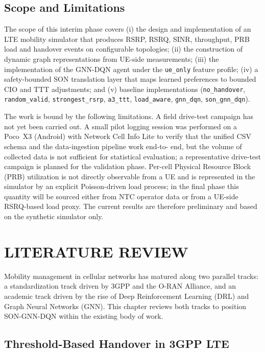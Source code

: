 \documentclass[12pt,a4paper,oneside]{report}
\begin{document}
\section{Scope and Limitations}

The scope of this interim phase covers (i) the design and implementation
of an LTE mobility simulator that produces RSRP, RSRQ, SINR, throughput,
PRB load and handover events on configurable topologies; (ii) the
construction of dynamic graph representations from UE-side measurements;
(iii) the implementation of the GNN-DQN agent under the
\texttt{ue\_only} feature profile; (iv) a safety-bounded SON translation
layer that maps learned preferences to bounded CIO and TTT adjustments;
and (v) baseline implementations (\texttt{no\_handover},
\texttt{random\_valid}, \texttt{strongest\_rsrp}, \texttt{a3\_ttt},
\texttt{load\_aware}, \texttt{gnn\_dqn}, \texttt{son\_gnn\_dqn}).

The work is bound by the following limitations. A field drive-test
campaign has not yet been carried out. A small pilot logging session was
performed on a Poco~X3 (Android) with Network Cell Info Lite to verify
that the unified CSV schema and the data-ingestion pipeline work end-to-
end, but the volume of collected data is not sufficient for statistical
evaluation; a representative drive-test campaign is planned for the
validation phase. Per-cell Physical Resource Block (PRB) utilization is
not directly observable from a UE and is represented in the simulator
by an explicit Poisson-driven load process; in the final phase this
quantity will be sourced either from NTC operator data or from a UE-side
RSRQ-based load proxy. The current results are therefore preliminary and
based on the synthetic simulator only.

\chapter{LITERATURE REVIEW}

Mobility management in cellular networks has matured along two parallel
tracks: a standardization track driven by 3GPP and the O-RAN Alliance,
and an academic track driven by the rise of Deep Reinforcement Learning
(DRL) and Graph Neural Networks (GNN). This chapter reviews both tracks
to position SON-GNN-DQN within the existing body of work.

\section{Threshold-Based Handover in 3GPP LTE}
\end{document}
